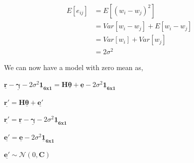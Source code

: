 \documentclass[a4 paper]{article}
\begin{document}
\begin{align*}
	E[e_{ij}] &= E[(w_{i} - w_{j})^{2}] 
	\\ &= Var[w_{i} - w_{j}] + E[w_{i} - w_{j}] 
	\\ &= Var[w_{i}] + Var[w_{j}]
	\\ &= 2\sigma^{2}
\end{align*} 

We can now have a model with zero mean as, 
\\ \centerline{$ \mathbf{\underline{r}} - \mathbf{\underline{\gamma}} - 2\sigma^{2}\mathbf{\underline{1}_{6x1}} = \mathbf{H}\mathbf{\underline{\theta}} + \mathbf{\underline{e}} - 2\sigma^{2}\mathbf{\underline{1}_{6x1}} $}

\centerline{$ \mathbf{\underline{r'}} = \mathbf{H}\mathbf{\underline{\theta}} + \mathbf{\underline{e'}} $}
\centerline{$ \mathbf{\underline{r'}} = \mathbf{\underline{r}} - \mathbf{\underline{\gamma}} - 2\sigma^{2}\mathbf{\underline{1}_{6x1}}$}
\centerline{$ \mathbf{\underline{e'}} = \mathbf{\underline{e}} - 2\sigma^{2}\mathbf{\underline{1}_{6x1}} $}
\centerline{$ \mathbf{\underline{e'}} \sim \mathcal{N}(0, \mathbf{C}) $ }
\end{document}
